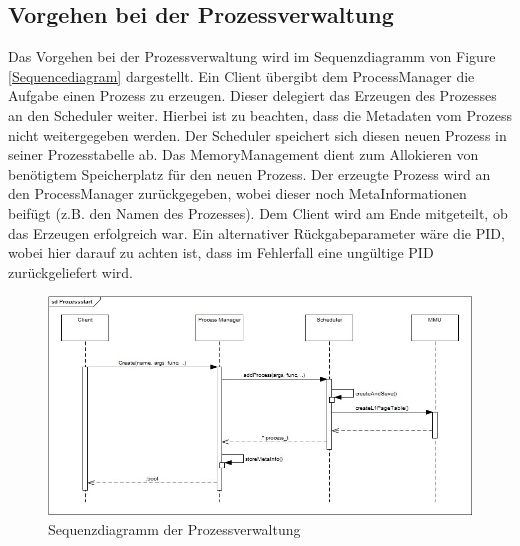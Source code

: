 \subsection{Vorgehen bei der Prozessverwaltung}
Das Vorgehen bei der Prozessverwaltung wird im Sequenzdiagramm von Figure \ref{Sequencediagram} dargestellt. Ein Client übergibt dem ProcessManager die Aufgabe einen Prozess zu erzeugen. Dieser delegiert das Erzeugen des Prozesses an den Scheduler weiter. Hierbei ist zu beachten, dass die Metadaten vom Prozess nicht weitergegeben werden. Der Scheduler speichert sich diesen neuen Prozess in seiner Prozesstabelle ab. Das MemoryManagement dient zum Allokieren von benötigtem Speicherplatz für den neuen Prozess. Der erzeugte Prozess wird an den ProcessManager zurückgegeben, wobei dieser noch MetaInformationen beifügt (z.B. den Namen des Prozesses). Dem Client wird am Ende mitgeteilt, ob das Erzeugen erfolgreich war. Ein alternativer Rückgabeparameter wäre die PID, wobei hier darauf zu achten ist, dass im Fehlerfall eine ungültige PID zurückgeliefert wird.

\begin{figure}[H]
	\includegraphics[scale=0.70]{chapters/processmanagement/figures/processmanagement-sequence-diagram}
	\caption{Sequenzdiagramm der Prozessverwaltung}
	\label{fig:Sequencediagram}
\end{figure}

\pagebreak 